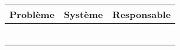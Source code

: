 \begin{tabularx}{\linewidth}{
    |>{\hsize=2.0\hsize}X|%
    >{\hsize=0.5\hsize}X|%
    >{\hsize=0.5\hsize}X|%
  }
    \hline
    \textbf{Problème} & \textbf{Système} & \textbf{Responsable} \\\hline
      &   &   \\\hline
      &   &   \\\hline
      &   &   \\\hline
      &   &   \\\hline
      &   &   \\\hline
      &   &   \\\hline
  \end{tabularx}
     